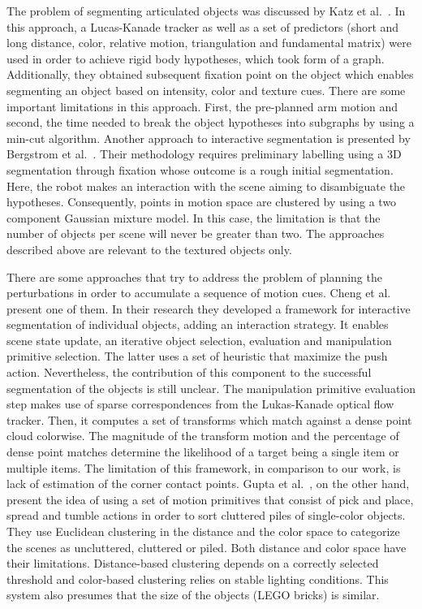 The problem of segmenting articulated objects was discussed by Katz et al.~\cite{Katz-WS-MM-ICRA2011}. In this approach, a Lucas-Kanade tracker as well as a set of predictors (short and long distance, color, relative motion, triangulation and fundamental matrix) were used in order to achieve rigid body hypotheses, which took form of a graph. Additionally, they obtained subsequent fixation point on the object which enables segmenting an object based on intensity, color and texture cues. There are some important limitations in this approach. First, the pre-planned arm motion and second, the time needed to break the object hypotheses into subgraphs by using a min-cut algorithm. 
Another approach to interactive segmentation is presented by Bergstrom et al.~\cite{bergstrom11icvs}. Their methodology requires preliminary labelling using a 3D segmentation through fixation whose outcome is a rough initial segmentation. Here, the robot makes an interaction with the scene aiming to disambiguate the hypotheses. Consequently, points in motion space are clustered by using a two component Gaussian mixture model. In this case, the limitation is that the number of objects per scene will never be greater than two.
The approaches described above are relevant to the textured objects only. 

There are some approaches that try to address the problem of planning the perturbations in order to accumulate a sequence of motion cues. Cheng et al.~\cite{chang11interactive} present one of them. In their research they developed a framework for interactive segmentation of individual objects, adding an interaction strategy. It enables scene state update, an iterative object selection, evaluation and manipulation primitive selection. The latter uses a set of heuristic that maximize the push action. Nevertheless, the contribution of this component to the successful segmentation of the objects is still unclear. The manipulation primitive evaluation step makes use of sparse correspondences from the Lukas-Kanade optical flow tracker. Then, it computes a set of transforms which match against a dense point cloud colorwise. The magnitude of the transform motion and the percentage of dense point matches determine the likelihood of a target being a single item or multiple items. The limitation of this framework, in comparison to our work, is lack of estimation of the corner contact points.
Gupta et al.~\cite{gupta11primitives}, on the other hand, present the idea of using a set of motion primitives that consist of pick and place, spread and tumble actions in order to sort cluttered piles of single-color objects. They use Euclidean clustering in the distance and the color space to categorize the scenes as uncluttered, cluttered or piled. Both distance and color space have their limitations. Distance-based clustering depends on a correctly selected threshold and color-based clustering relies on stable lighting conditions. This system also presumes that the size of the objects (LEGO bricks) is similar. 

